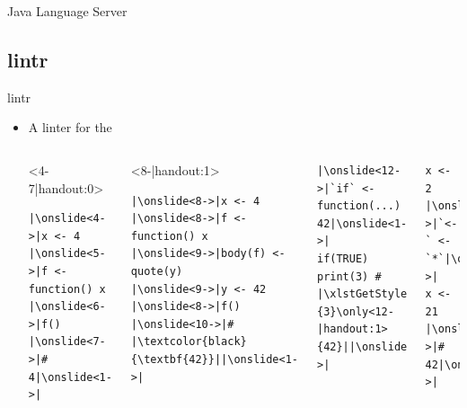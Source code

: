 \documentclass[
   aspectratio=169, %
   10pt, %
   uniqueslidenumber,
   professionalfonts
]{beamer}
\makeatletter
\DeclareRobustCommand*\xfancyul[2][white]{%
   \def\fancyul@background{#1}%
   \def\ULdepth{1pt}%
   \def\ULthickness{.1ex}%
   \contourlength{.35pt}%
   \mbox{{\color{lightgray}\uline{\phantom{#2}}}\llap{\contour\fancyul@background{#2}}}%
}
\def\link#1#2{\href{#1}{\xfancyul{#2}}}
\makeatother
\begin{document}
\begin{frame}{Java Language Server}
\end{frame}

\subsection{lintr}
\begin{frame}[fragile]{lintr}
   \begin{itemize}
      \item<2-> A linter for the 
\begin{columns}[onlytextwidth,c]
\begin{onlyenv}<4-7|handout:0>
\begin{verbatim}
|\onslide<4->|x <- 4
|\onslide<5->|f <- function() x
|\onslide<6->|f() |\onslide<7->|# 4|\onslide<1->|
\end{verbatim}
\end{onlyenv}
\begin{onlyenv}<8-|handout:1>
\begin{verbatim}
|\onslide<8->|x <- 4
|\onslide<8->|f <- function() x
|\onslide<9->|body(f) <- quote(y)
|\onslide<9->|y <- 42
|\onslide<8->|f() |\onslide<10->|# |\textcolor{black}{\textbf{42}}||\onslide<1->|
\end{verbatim}
\endAnimateCode
\end{onlyenv}
\color{black}\vspace*{-\baselineskip}%
\begin{verbatim}
|\onslide<12->|`if` <- function(...) 42|\onslide<1->|
if(TRUE) print(3) # |\xlstGetStyle{comments}\only<-11|handout:0>{3}\only<12-|handout:1>{42}||\onslide<1->|
\end{verbatim}
\color{black}\vspace*{-\baselineskip}%
\begin{verbatim}
x <- 2
|\onslide<14->|`<-` <- `*`|\onslide<1->|
x <- 21 |\onslide<14->|# 42|\onslide<1->|
\end{verbatim}
\end{columns}\color{black}
\vspace*{-1\baselineskip}


\end{itemize}
\end{frame}
\end{document}
